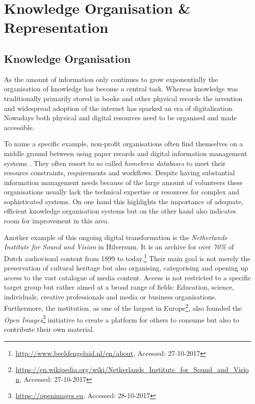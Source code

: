 \section{Knowledge Organisation \& Representation} \label{organisation-and-representation}

\subsection{Knowledge Organisation}
As the amount of information only continues to grow exponentially the organisation of knowledge has become a central task.
Whereas knowledge was traditionally primarily stored in books and other physical records the invention and widespread adoption of the internet has sparked an era of digitalisation.
Nowadays both physical and digital resources need to be organised and made accessible.

To name a specific example, non-profit organisations often find themselves on a middle ground between using paper records and digital information management systems \cite{Voida2011b}.
They often resort to so called \textit{homebrew databases}\cite{Voida2011b} to meet their resource constraints, requirements and workflows.
Despite having substantial information management needs because of the large amount of volunteers these organisations usually lack the technical expertise or resources for complex and sophisticated systems.
On one hand this highlights the importance of adequate, efficient knowledge organisation systems but on the other hand also indicates room for improvement in this area.

Another example of this ongoing digital transformation is the \textit{Netherlands Institute for Sound and Vision} in Hilversum.
It is an archive for over \textit{70\%} of Dutch audiovisual content from 1899 to today.\footnote{\url{http://www.beeldengeluid.nl/en/about}, Accessed: 27-10-2017}
Their main goal is not merely the preservation of cultural heritage but also organising, categorising and opening up access to the vast catalogue of media content.
Access is not restricted to a specific target group but rather aimed at a broad range of fields: Education, science, individuals, creative professionals and media or business organisations.
Furthermore, the institution, as one of the largest in Europe\footnote{\url{https://en.wikipedia.org/wiki/Netherlands_Institute_for_Sound_and_Vision}, Accessed: 27-10-2017}, also founded the \textit{Open Images}\footnote{\url{https://openimages.eu}, Accessed: 28-10-2017} initiative to create a platform for others to consume but also to contribute their own material.

